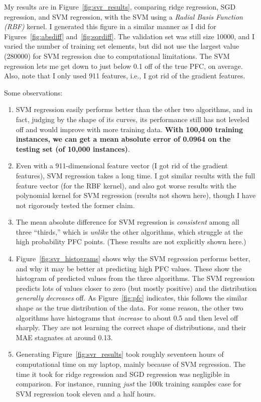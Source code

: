 \documentclass[a4paper, 11pt]{article}
\begin{document}
My results are in Figure~\ref{fig:svr_results}, comparing ridge regression, SGD regression, and SVM
regression, with the SVM using a \emph{Radial Basis Function (RBF)} kernel. I generated this figure
in a similar manner as I did for Figures~\ref{fig:absdiff} and~\ref{fig:sqrdiff}. The validation set
was still size 10000, and I varied the number of training set elements, but did not use the largest
value (280000) for SVM regression due to computational limitations. The SVM regression lets me get
down to just below 0.1 off of the true PFC, on average. Also, note that I only used 911 features,
i.e., I got rid of the gradient features.

Some observations:

\begin{enumerate}
    \item SVM regression easily performs better than the other two algorithms, and in fact, judging
    by the shape of its curves, its performance still has not leveled off and would improve with
    more training data. \textbf{With 100,000 training instances, we can get a mean absolute error of
    0.0964 on the testing set (of 10,000 instances)}.

    \item Even with a 911-dimensional feature vector (I got rid of the gradient features), SVM
    regression takes a long time. I got similar results with the full feature vector (for the RBF
    kernel), and also got worse results with the polynomial kernel for SVM regression (results not
    shown here), though I have not rigorously tested the former claim.

    \item The mean absolute difference for SVM regression is \emph{consistent} among all three
    ``thirds,'' which is \emph{unlike} the other algorithms, which struggle at the high probability
    PFC points. (These results are not explicitly shown here.)

    \item Figure~\ref{fig:svr_histograms} shows why the SVM regression performs better, and why it
    may be better at predicting high PFC values. These show the histogram of predicted values from
    the three algorithms. The SVM regression predicts lots of values closer to zero (but mostly
    positive) and the distribution \emph{generally decreases} off. As Figure~\ref{fig:pfc}
    indicates, this follows the similar shape as the true distribution of the data. For some reason,
    the other two algorithms have histograms that \emph{increase} to about 0.5 and then level off
    sharply. They are not learning the correct shape of distributions, and their MAE stagnates at
    around 0.13.

    \item Generating Figure~\ref{fig:svr_results} took roughly seventeen hours of computational time
    on my laptop, mainly because of SVM regression.  The time it took for ridge regression and SGD
    regression was negligible in comparison. For instance, running \emph{just} the 100k training
    samples case for SVM regression took eleven and a half hours.
\end{enumerate}
\end{document}
